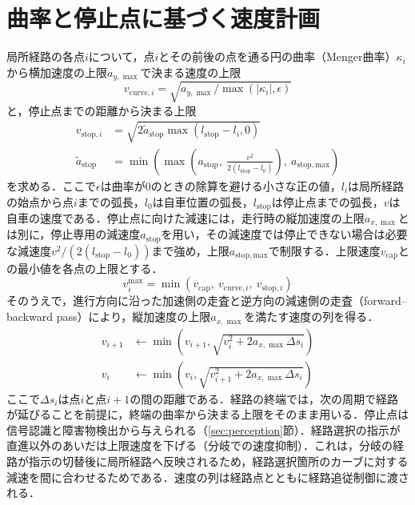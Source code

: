 \section{曲率と停止点に基づく速度計画}
\label{sec:speed_planner}
局所経路の各点$i$について，点$i$とその前後の点を通る円の曲率（Menger曲率）$\kappa_i$から横加速度の上限$a_{y,\max}$で決まる速度の上限
\begin{equation}
  v_{\mathrm{curve},i} = \sqrt{a_{y,\max}/\max(|\kappa_i|, \epsilon)}
  \label{eq:vcurve}
\end{equation}
と，停止点までの距離から決まる上限
\begin{align}
  v_{\mathrm{stop},i} &= \sqrt{2 \tilde{a}_{\mathrm{stop}} \max(l_{\mathrm{stop}} - l_i, 0)} \label{eq:vstop}\\
  \tilde{a}_{\mathrm{stop}} &= \min\left(\max\left(a_{\mathrm{stop}},\ \frac{v^2}{2(l_{\mathrm{stop}} - l_0)}\right),\ a_{\mathrm{stop,max}}\right) \label{eq:astop}
\end{align}
を求める．ここで$\epsilon$は曲率が0のときの除算を避ける小さな正の値，$l_i$は局所経路の始点から点$i$までの弧長，$l_0$は自車位置の弧長，$l_{\mathrm{stop}}$は停止点までの弧長，$v$は自車の速度である．停止点に向けた減速には，走行時の縦加速度の上限$a_{x,\max}$とは別に，停止専用の減速度$a_{\mathrm{stop}}$を用い，その減速度では停止できない場合は必要な減速度$v^2/(2(l_{\mathrm{stop}}-l_0))$まで強め，上限$a_{\mathrm{stop,max}}$で制限する．上限速度$v_{\mathrm{cap}}$との最小値を各点の上限とする．
\begin{equation}
  v^{\max}_i = \min\left(v_{\mathrm{cap}},\ v_{\mathrm{curve},i},\ v_{\mathrm{stop},i}\right)
  \label{eq:vlimit}
\end{equation}
そのうえで，進行方向に沿った加速側の走査と逆方向の減速側の走査（forward--backward pass）\cite{velenis2008,lipp2014}により，縦加速度の上限$a_{x,\max}$を満たす速度の列を得る．
\begin{align}
  v_{i+1} &\leftarrow \min\left(v_{i+1}, \sqrt{v_i^2 + 2 a_{x,\max}\Delta s_i}\right) \label{eq:forward}\\
  v_{i} &\leftarrow \min\left(v_{i}, \sqrt{v_{i+1}^2 + 2 a_{x,\max}\Delta s_i}\right) \label{eq:backward}
\end{align}
ここで$\Delta s_i$は点$i$と点$i+1$の間の距離である．経路の終端では，次の周期で経路が延びることを前提に，終端の曲率から決まる上限をそのまま用いる．停止点は信号認識と障害物検出から与えられる（\ref{sec:perception}節）．経路選択の指示が直進以外のあいだは上限速度を下げる（分岐での速度抑制）．これは，分岐の経路が指示の切替後に局所経路へ反映されるため，経路選択箇所のカーブに対する減速を間に合わせるためである．速度の列は経路点とともに経路追従制御に渡される．

